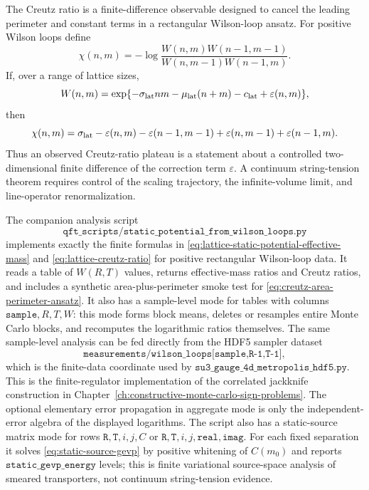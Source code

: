 The Creutz ratio is a finite-difference observable designed to cancel the
leading perimeter and constant terms in a rectangular Wilson-loop ansatz.
For positive Wilson loops define
\begin{equation}
  \chi(n,m)
  =
  -\log
  \frac{W(n,m)W(n-1,m-1)}
       {W(n,m-1)W(n-1,m)} .
  \label{eq:lattice-creutz-ratio}
\end{equation}
If, over a range of lattice sizes,
\begin{equation}
  W(n,m)=
  \exp\{-\sigma_{\rm lat}nm-\mu_{\rm lat}(n+m)-c_{\rm lat}
       +\varepsilon(n,m)\},
  \label{eq:creutz-area-perimeter-ansatz}
\end{equation}
then
\begin{equation}
  \chi(n,m)=
  \sigma_{\rm lat}
  -
  \varepsilon(n,m)-\varepsilon(n-1,m-1)
  +\varepsilon(n,m-1)+\varepsilon(n-1,m).
  \label{eq:creutz-ratio-error-combination}
\end{equation}
Thus an observed Creutz-ratio plateau is a statement about a controlled
two-dimensional finite difference of the correction term \(\varepsilon\).
A continuum string-tension theorem requires control of the scaling trajectory,
the infinite-volume limit, and line-operator renormalization.

The companion analysis script
\[
  \texttt{qft\_scripts/static\_potential\_from\_wilson\_loops.py}
\]
implements exactly the finite formulas in
\eqref{eq:lattice-static-potential-effective-mass} and
\eqref{eq:lattice-creutz-ratio} for positive rectangular Wilson-loop data.
It reads a table of \(W(R,T)\) values, returns effective-mass ratios and
Creutz ratios, and includes a synthetic area-plus-perimeter smoke test for
\eqref{eq:creutz-area-perimeter-ansatz}.  It also has a sample-level mode for
tables with columns \(\texttt{sample},R,T,W\): this mode forms block means,
deletes or resamples entire Monte Carlo blocks, and recomputes the logarithmic
ratios themselves.  The same sample-level analysis can be fed directly from
the HDF5 sampler dataset
\[
  \texttt{measurements/wilson\_loops[sample,R-1,T-1]},
\]
which is the finite-data coordinate used by
\(\texttt{su3\_gauge\_4d\_metropolis\_hdf5.py}\).  This is the
finite-regulator implementation of the
correlated jackknife construction in
Chapter~\ref{ch:constructive-monte-carlo-sign-problems}.  The optional
elementary error propagation in aggregate mode is only the independent-error
algebra of the displayed logarithms.  The script also has a static-source matrix
mode for rows \(\texttt{R},\texttt{T},i,j,C\) or
\(\texttt{R},\texttt{T},i,j,\texttt{real},\texttt{imag}\).  For each fixed
separation it solves \eqref{eq:static-source-gevp} by positive whitening of
\(C(m_0)\) and reports \(\texttt{static\_gevp\_energy}\) levels; this is
finite variational source-space analysis of smeared transporters, not
continuum string-tension evidence.

